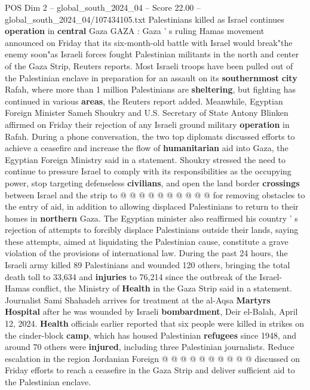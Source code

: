 \begin{textsample}{POS Dim 2 – global\_south\_2024\_04 – Score 22.00 – global\_south\_2024\_04/107434105.txt}  \label{ex:f2_pos_160}
Palestinians killed as Israel continues \textbf{operation} in \textbf{central} Gaza GAZA : Gaza ' s ruling Hamas movement announced on Friday that its six-month-old battle with Israel would break"the enemy soon"as Israeli forces fought Palestinian militants in the north and center of the Gaza Strip, Reuters reports.
Most Israeli troops have been pulled out of the Palestinian enclave in preparation for an assault on its \textbf{southernmost} \textbf{city} Rafah, where more than 1 million Palestinians are \textbf{sheltering}, but fighting has continued in various \textbf{areas}, the Reuters report added.
Meanwhile, Egyptian Foreign Minister Sameh Shoukry and U.S.
Secretary of State Antony Blinken affirmed on Friday their rejection of any Israeli ground military \textbf{operation} in Rafah.
During a phone conversation, the two top diplomats discussed efforts to achieve a ceasefire and increase the flow of \textbf{humanitarian} aid into Gaza, the Egyptian Foreign Ministry said in a statement.
Shoukry stressed the need to continue to pressure Israel to comply with its responsibilities as the occupying power, stop targeting defenseless \textbf{civilians}, and open the land border \textbf{crossings} between Israel and the strip to @ @ @ @ @ @ @ @ @ @ for removing obstacles to the entry of aid, in addition to allowing displaced Palestinians to return to their homes in \textbf{northern} Gaza.
The Egyptian minister also reaffirmed his country ' s rejection of attempts to forcibly displace Palestinians outside their lands, saying these attempts, aimed at liquidating the Palestinian cause, constitute a grave violation of the provisions of international law.
During the past 24 hours, the Israeli army killed 89 Palestinians and wounded 120 others, bringing the total death toll to 33,634 and \textbf{injuries} to 76,214 since the outbreak of the Israel-Hamas conflict, the Ministry of \textbf{Health} in the Gaza Strip said in a statement.
Journalist Sami Shahadeh arrives for treatment at the al-Aqsa \textbf{Martyrs} \textbf{Hospital} after he was wounded by Israeli \textbf{bombardment}, Deir el-Balah, April 12, 2024. \textbf{Health} officials earlier reported that six people were killed in strikes on the cinder-block \textbf{camp}, which has housed Palestinian \textbf{refugees} since 1948, and around 70 others were \textbf{injured}, including three Palestinian journalists.
Reduce escalation in the region Jordanian Foreign @ @ @ @ @ @ @ @ @ @ discussed on Friday efforts to reach a ceasefire in the Gaza Strip and deliver sufficient aid to the Palestinian enclave.

\end{textsample}
